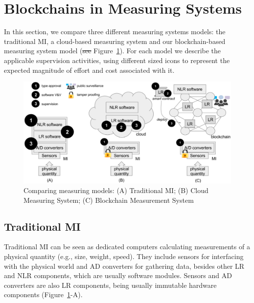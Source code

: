 \documentclass[journal]{IEEEtran} %
\providecommand{\DIFdel}[1]{{\protect\color{red}\sout{#1}}}                      %
\providecommand{\DIFdelbegin}{} %
\providecommand{\DIFdelend}{} %
\begin{document}
\section{Blockchains in Measuring Systems}
In this section, we compare three different measuring systems models: the traditional MI, a cloud-based measuring system and our blockchain-based measuring system model (\DIFdelbegin \DIFdel{see }\DIFdelend Figure~\ref{f:compare}). For each model we describe the applicable supervision activities, using different sized icons to represent the expected magnitude of effort and cost associated with it.

\begin{figure}[!t]
\centering
\includegraphics[width=.69\textwidth]{measuring} %
\caption{Comparing measuring models: (A) Traditional MI; (B) Cloud Measuring System; (C) Blockchain Measurement System}
\label{f:compare}
\end{figure}

\subsection{Traditional MI}
\label{s:mi_traditional}
Traditional MI can be seen as dedicated computers calculating measurements of a physical quantity (e.g., size, weight, speed). They include sensors for interfacing with the physical world and AD converters for gathering data, besides other LR and NLR components, which are usually software modules. Sensors and AD converters are also LR components, being usually immutable hardware components (Figure~\ref{f:compare}-A).
\end{document}
